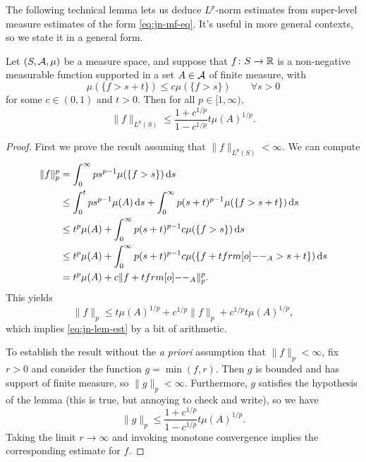 The following technical lemma lets us deduce $L^p$-norm estimates from super-level measure estimates of the form \eqref{eq:jn-mf-eq}.
It's useful in more general contexts, so we state it in a general form.

\begin{lem}\label{lem:jn-ms-lem}
  Let $(S,\mathcal{A},\mu)$ be a measure space, and suppose that $f \colon S \rightarrow \mathbb{R}$ is a non-negative measurable function supported in a set $A \in \mathcal{A}$ of finite measure, with
  \begin{equation*}
    \mu(\{f > s+t\}) \leq c \mu(\{f > s\}) \qquad \forall s > 0
  \end{equation*}
  for some $c \in (0,1)$ and $t > 0$.
  Then for all $p \in [1,\infty)$,
  \begin{equation}\label{eq:jn-lem-est}
    \|f\|_{L^p(S)} \leq \frac{1 + c^{1/p}}{1 - c^{1/p}} t \mu(A)^{1/p}.
  \end{equation}
\end{lem}

\begin{proof}
  First we prove the result assuming that $\|f\|_{L^p(S)} < \infty$.
  We can compute
  \begin{equation*}
    \begin{aligned}
      \|f\|_{p}^{p} &= \int_{0}^{\infty} ps^{p-1} \mu(\{f > s\}) \, \dd s \\
      &\leq \int_{0}^{t} ps^{p-1}\mu(A) \, \dd s + \int_{0}^{\infty} p(s+t)^{p-1}\mu(\{f > s+t\}) \, \dd s \\
      &\leq t^{p}\mu(A) + \int_{0}^{\infty} p(s + t)^{p-1}c\mu(\{f > s\}) \, \dd s \\
      &\leq t^{p}\mu(A) + \int_{0}^{\infty} p(s + t)^{p-1}c\mu(\{f + t\1_{A} > s + t\}) \, \dd s \\
      &= t^{p}\mu(A) + c\|f + t\1_{A}\|_{p}^{p}.
    \end{aligned}
  \end{equation*}
  This yields
  \begin{equation*}
    \|f\|_{p} \leq t \mu(A)^{1/p} + c^{1/p}\|f\|_{p} + c^{1/p} t \mu(A)^{1/p},
  \end{equation*}
  which implies \eqref{eq:jn-lem-est} by a bit of arithmetic.

  To establish the result without the \emph{a priori} assumption that $\|f\|_{p} < \infty$, fix $r > 0$ and consider the function $g = \min(f,r)$.
  Then $g$ is bounded and has support of finite measure, so $\|g\|_{p} < \infty$.
  Furthermore, $g$ satisfies the hypothesis of the lemma (this is true, but annoying to check and write), so we have
  \begin{equation*}
    \|g\|_{p} \leq \frac{1 + c^{1/p}}{1 - c^{1/p}} t\mu(A)^{1/p}.
  \end{equation*}
  Taking the limit $r \to \infty$ and invoking monotone convergence implies the corresponding estimate for $f$. 
\end{proof}

